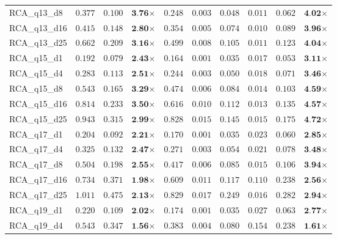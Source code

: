 \begin{table*}[t]
{\begin{tabular}{| l || r r c || r r r r r c |}
RCA\_q13\_d8 & $0.377$ & $0.100$ & $\textbf{3.76}$$\times$ & $0.248$ & $0.003$ & $0.048$ & $0.011$ & $0.062$ & $\textbf{4.02}$$\times$ \\
RCA\_q13\_d16 & $0.415$ & $0.148$ & $\textbf{2.80}$$\times$ & $0.354$ & $0.005$ & $0.074$ & $0.010$ & $0.089$ & $\textbf{3.96}$$\times$ \\
RCA\_q13\_d25 & $0.662$ & $0.209$ & $\textbf{3.16}$$\times$ & $0.499$ & $0.008$ & $0.105$ & $0.011$ & $0.123$ & $\textbf{4.04}$$\times$ \\
RCA\_q15\_d1 & $0.192$ & $0.079$ & $\textbf{2.43}$$\times$ & $0.164$ & $0.001$ & $0.035$ & $0.017$ & $0.053$ & $\textbf{3.11}$$\times$ \\
RCA\_q15\_d4 & $0.283$ & $0.113$ & $\textbf{2.51}$$\times$ & $0.244$ & $0.003$ & $0.050$ & $0.018$ & $0.071$ & $\textbf{3.46}$$\times$ \\
RCA\_q15\_d8 & $0.543$ & $0.165$ & $\textbf{3.29}$$\times$ & $0.474$ & $0.006$ & $0.084$ & $0.014$ & $0.103$ & $\textbf{4.59}$$\times$ \\
RCA\_q15\_d16 & $0.814$ & $0.233$ & $\textbf{3.50}$$\times$ & $0.616$ & $0.010$ & $0.112$ & $0.013$ & $0.135$ & $\textbf{4.57}$$\times$ \\
RCA\_q15\_d25 & $0.943$ & $0.315$ & $\textbf{2.99}$$\times$ & $0.828$ & $0.015$ & $0.145$ & $0.015$ & $0.175$ & $\textbf{4.72}$$\times$ \\
RCA\_q17\_d1 & $0.204$ & $0.092$ & $\textbf{2.21}$$\times$ & $0.170$ & $0.001$ & $0.035$ & $0.023$ & $0.060$ & $\textbf{2.85}$$\times$ \\
RCA\_q17\_d4 & $0.325$ & $0.132$ & $\textbf{2.47}$$\times$ & $0.271$ & $0.003$ & $0.054$ & $0.021$ & $0.078$ & $\textbf{3.48}$$\times$ \\
RCA\_q17\_d8 & $0.504$ & $0.198$ & $\textbf{2.55}$$\times$ & $0.417$ & $0.006$ & $0.085$ & $0.015$ & $0.106$ & $\textbf{3.94}$$\times$ \\
RCA\_q17\_d16 & $0.734$ & $0.371$ & $\textbf{1.98}$$\times$ & $0.609$ & $0.011$ & $0.117$ & $0.110$ & $0.238$ & $\textbf{2.56}$$\times$ \\
RCA\_q17\_d25 & $1.011$ & $0.475$ & $\textbf{2.13}$$\times$ & $0.829$ & $0.017$ & $0.249$ & $0.016$ & $0.282$ & $\textbf{2.94}$$\times$ \\
RCA\_q19\_d1 & $0.220$ & $0.109$ & $\textbf{2.02}$$\times$ & $0.174$ & $0.001$ & $0.035$ & $0.027$ & $0.063$ & $\textbf{2.77}$$\times$ \\
RCA\_q19\_d4 & $0.543$ & $0.347$ & $\textbf{1.56}$$\times$ & $0.383$ & $0.004$ & $0.080$ & $0.154$ & $0.238$ & $\textbf{1.61}$$\times$ \\

\end{tabular}}
\end{table*}
